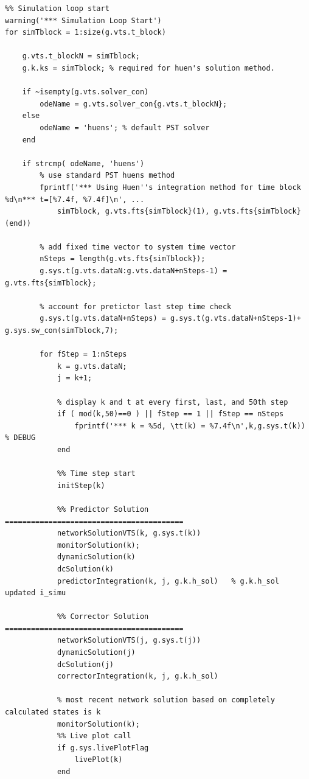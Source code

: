 \documentclass[12pt]{article}
\begin{document}
\begin{verbatim}
%% Simulation loop start
warning('*** Simulation Loop Start')
for simTblock = 1:size(g.vts.t_block)
    
    g.vts.t_blockN = simTblock;
    g.k.ks = simTblock; % required for huen's solution method.
    
    if ~isempty(g.vts.solver_con)
        odeName = g.vts.solver_con{g.vts.t_blockN};
    else
        odeName = 'huens'; % default PST solver
    end
    
    if strcmp( odeName, 'huens')
        % use standard PST huens method
        fprintf('*** Using Huen''s integration method for time block %d\n*** t=[%7.4f, %7.4f]\n', ...
            simTblock, g.vts.fts{simTblock}(1), g.vts.fts{simTblock}(end))
        
        % add fixed time vector to system time vector
        nSteps = length(g.vts.fts{simTblock});
        g.sys.t(g.vts.dataN:g.vts.dataN+nSteps-1) = g.vts.fts{simTblock};
        
        % account for pretictor last step time check
        g.sys.t(g.vts.dataN+nSteps) = g.sys.t(g.vts.dataN+nSteps-1)+ g.sys.sw_con(simTblock,7);
        
        for fStep = 1:nSteps
            k = g.vts.dataN;
            j = k+1;
            
            % display k and t at every first, last, and 50th step
            if ( mod(k,50)==0 ) || fStep == 1 || fStep == nSteps
                fprintf('*** k = %5d, \tt(k) = %7.4f\n',k,g.sys.t(k)) % DEBUG
            end
            
            %% Time step start
            initStep(k)
            
            %% Predictor Solution =========================================
            networkSolutionVTS(k, g.sys.t(k))
            monitorSolution(k);
            dynamicSolution(k)
            dcSolution(k)
            predictorIntegration(k, j, g.k.h_sol)   % g.k.h_sol updated i_simu
            
            %% Corrector Solution =========================================
            networkSolutionVTS(j, g.sys.t(j))
            dynamicSolution(j)
            dcSolution(j)
            correctorIntegration(k, j, g.k.h_sol)
            
            % most recent network solution based on completely calculated states is k
            monitorSolution(k);
            %% Live plot call
            if g.sys.livePlotFlag
                livePlot(k)
            end
            

\end{verbatim}
\end{document}
